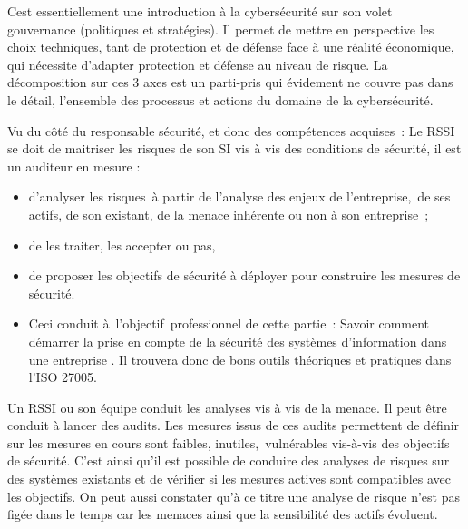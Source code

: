 
\begin{nota}
C\ecours est essentiellement une introduction à la cybersécurité sur son volet gouvernance (politiques et stratégies). Il permet de mettre en perspective les choix techniques, tant de protection et de défense face à une réalité économique, qui nécessite d'adapter protection et défense au niveau de risque. La décomposition sur ces 3 axes est un parti-pris qui évidement ne couvre pas dans le détail, l'ensemble des processus et actions du domaine de la cybersécurité. 
\end{nota}

Vu du côté du responsable sécurité, et donc des compétences acquises : Le RSSI se doit de  maitriser les risques de son SI vis à vis des conditions de sécurité, il est un auditeur en mesure : 

\begin{itemize}
  \item d'analyser les risques à partir de l'analyse des enjeux de l'entreprise, de ses actifs, de son existant, de la menace inhérente ou non à son entreprise ;
  \item de les traiter, les accepter ou pas, 
  \item de proposer les objectifs de sécurité à déployer pour construire les mesures de sécurité.
  \item Ceci conduit à l'objectif professionnel de cette partie :  Savoir comment démarrer la prise en compte de la sécurité des systèmes d'information dans une entreprise .  Il trouvera donc de bons outils théoriques et pratiques dans l'ISO 27005.
\end{itemize}


\begin{nota}
Un RSSI ou son équipe conduit les analyses vis à vis de la menace. Il peut être conduit à lancer des audits.  Les mesures issus de ces audits permettent de définir sur les mesures en cours sont faibles, inutiles, vulnérables vis-à-vis des objectifs de sécurité. C'est ainsi qu'il est possible de conduire des analyses de risques sur des systèmes existants et de vérifier si les mesures actives sont compatibles avec les objectifs. On peut aussi constater qu'à ce titre une analyse de risque n'est pas figée dans le temps car les menaces ainsi que la sensibilité des actifs évoluent.
\end{nota}


